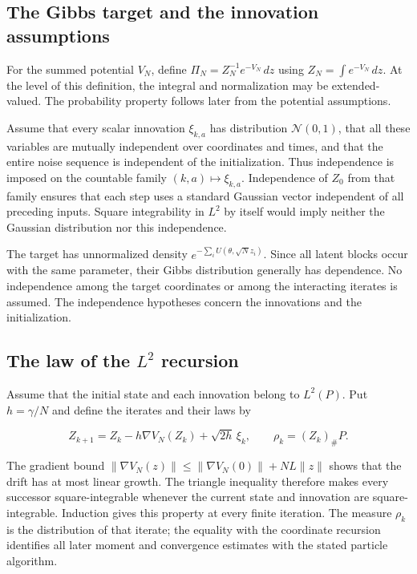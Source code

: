 \documentclass[11pt,a4paper]{article}
\begin{document}
\subsection{\texorpdfstring{The Gibbs target and the innovation assumptions}{The Gibbs target and the innovation assumptions}}


For the summed potential \(V_N\), define \(\Pi_N=Z_N^{-1}e^{-V_N}\,dz\) using \(Z_N=\int e^{-V_N}\,dz\). At the level of this definition, the integral and normalization may be extended-valued. The probability property follows later from the potential assumptions.



Assume that every scalar innovation \(\xi_{k,a}\) has distribution \(\mathcal N(0,1)\), that all these variables are mutually independent over coordinates and times, and that the entire noise sequence is independent of the initialization. Thus independence is imposed on the countable family \((k,a)\mapsto\xi_{k,a}\). Independence of \(Z_0\) from that family ensures that each step uses a standard Gaussian vector independent of all preceding inputs. Square integrability in \(L^2\) by itself would imply neither the Gaussian distribution nor this independence.



The target has unnormalized density \(e^{-\sum_i U(\theta,\sqrt N z_i)}\). Since all latent blocks occur with the same parameter, their Gibbs distribution generally has dependence. No independence among the target coordinates or among the interacting iterates is assumed. The independence hypotheses concern the innovations and the initialization.



\subsection{\texorpdfstring{The law of the \(L^2\) recursion}{The law of the L² recursion}}


Assume that the initial state and each innovation belong to \(L^2(P)\). Put \(h=\gamma/N\) and define the iterates and their laws by

\[Z_{k+1}=Z_k-h\nabla V_N(Z_k)+\sqrt{2h}\,\xi_k,\qquad \rho_k=(Z_k)_\#P.\]

The gradient bound \(\|\nabla V_N(z)\|\le\|\nabla V_N(0)\|+NL\|z\|\) shows that the drift has at most linear growth. The triangle inequality therefore makes every successor square-integrable whenever the current state and innovation are square-integrable. Induction gives this property at every finite iteration. The measure \(\rho_k\) is the distribution of that iterate; the equality with the coordinate recursion identifies all later moment and convergence estimates with the stated particle algorithm.
\end{document}
